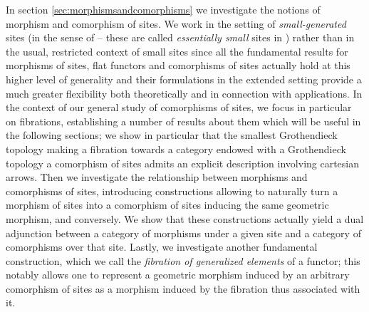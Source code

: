 \documentclass[a4paper,12pt]{article}
\begin{document}
In section \ref{sec:morphismsandcomorphisms} we investigate the notions of morphism and comorphism of sites. We work in the setting of \emph{small-generated} sites (in the sense of \cite{Shulman} -- these are called \emph{essentially small} sites in \cite{El}) rather than in the usual, restricted context of small sites since all the fundamental results for morphisms of sites, flat functors and comorphisms of sites actually hold at this higher level of generality and their formulations in the extended setting provide a much greater flexibility both theoretically and in connection with applications. In the context of our general study of comorphisms of sites, we focus in particular on fibrations, establishing a number of results about them which will be useful in the following sections; we show in particular that the smallest Grothendieck topology making a fibration towards a category endowed with a Grothendieck topology a comorphism of sites admits an explicit description involving cartesian arrows. Then we investigate the relationship between morphisms and comorphisms of sites, introducing constructions allowing to naturally turn a morphism of sites into a comorphism of sites inducing the same geometric morphism, and conversely. We show that these constructions actually yield a dual adjunction between a category of morphisms under a given site and a category of comorphisms over that site. Lastly, we investigate another fundamental construction, which we call the \emph{fibration of generalized elements} of a functor; this notably allows one to represent a geometric morphism induced by an arbitrary comorphism of sites as a morphism induced by the fibration thus associated with it.      
\end{document}
